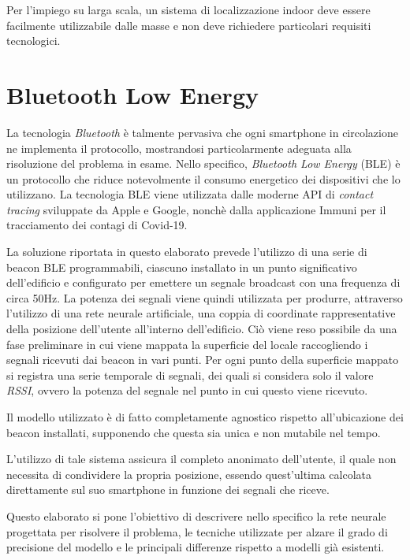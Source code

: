 \documentclass[draft]{standalone}
\begin{document}
Per l'impiego su larga scala, un sistema di localizzazione indoor deve essere
facilmente utilizzabile dalle masse e non deve richiedere particolari requisiti
tecnologici.

\section{Bluetooth Low Energy}
La tecnologia \emph{Bluetooth} è talmente pervasiva che ogni smartphone in
circolazione ne implementa il protocollo, mostrandosi particolarmente adeguata
alla risoluzione del problema in esame. Nello specifico, \emph{Bluetooth Low
  Energy} (BLE) è un protocollo che riduce notevolmente il consumo energetico
dei dispositivi che lo utilizzano. La tecnologia BLE viene utilizzata dalle
moderne API di \emph{contact tracing} sviluppate da Apple e Google, nonchè
dalla applicazione Immuni\cite{immuni} per il tracciamento dei contagi di
Covid-19\cite{apple-google}.

La soluzione riportata in questo elaborato prevede l'utilizzo di una serie di
beacon BLE programmabili, ciascuno installato in un punto significativo
dell'edificio e configurato per emettere un segnale broadcast con una frequenza
di circa 50Hz. La potenza dei segnali viene quindi utilizzata per produrre,
attraverso l'utilizzo di una rete neurale artificiale, una coppia di coordinate
rappresentative della posizione dell'utente all'interno dell'edificio. Ciò
viene reso possibile da una fase preliminare in cui viene mappata la superficie
del locale raccogliendo i segnali ricevuti dai beacon in vari punti. Per ogni
punto della superficie mappato si registra una serie temporale di segnali, dei
quali si considera solo il valore \emph{RSSI}, ovvero la potenza del segnale
nel punto in cui questo viene ricevuto.

Il modello utilizzato è di fatto completamente agnostico rispetto
all'ubicazione dei beacon installati, supponendo che questa sia unica e non
mutabile nel tempo.

L'utilizzo di tale sistema assicura il completo anonimato dell'utente, il quale
non necessita di condividere la propria posizione, essendo quest'ultima
calcolata direttamente sul suo smartphone in funzione dei segnali che riceve.

Questo elaborato si pone l'obiettivo di descrivere nello specifico la rete
neurale progettata per risolvere il problema, le tecniche utilizzate per alzare
il grado di precisione del modello e le principali differenze rispetto a
modelli già esistenti.
\end{document}
